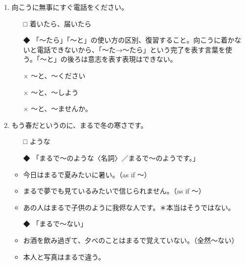 \documentclass[
uplatex,
b5paper,
10pt,
dvipdfmx
]{jsbook}
\begin{document}
\begin{enumerate}
\item 向こうに無事に\underline{\hspace{3zw}}すぐ電話をください。

\begin{itemize}
\item[□] 着いたら、届いたら
\item[◆] 「〜たら」「〜と」の使い方の区別、復習すること。向こうに着かな
	  いと電話できないから、「〜た→〜たら」という完了を表す言葉を使
	  う。「〜と」の後ろは意志を表す表現はできない。
\end{itemize}

\begin{itemize}
\item[×] 〜と、〜ください
\item[×] 〜と、〜しよう
\item[×] 〜と、〜ませんか。
\end{itemize}

\item もう春だというのに、まるで冬の\underline{\hspace{3zw}}寒さです。
\begin{itemize}
\item[□] ような
\item[◆] 「まるで〜のような〈名詞〉／まるで〜のようです。」
\end{itemize}
\begin{itemize}
\item 今日はまるで夏みたいに暑い。（as if 〜）
\item まるで夢でも見ているみたいで信じられません。（as if 〜）
\item あの人はまるで子供のように我侭な人です。＊本当はそうではない。
\end{itemize}

\begin{itemize}
\item[◆] 「まるで〜ない」
\end{itemize}

\begin{itemize}
\item お酒を飲み過ぎて、夕べのことはまるで覚えていない。（全然〜ない）
\item 本人と写真はまるで違う。
\end{itemize}


\end{enumerate}
\end{document}
